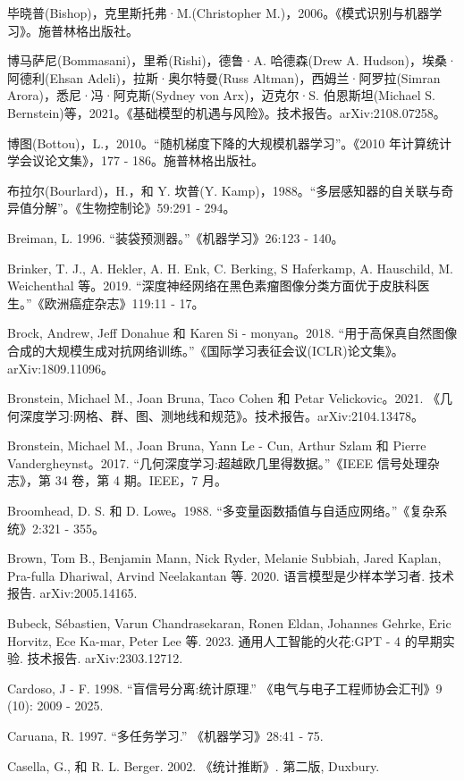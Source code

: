 \documentclass[10pt]{report}
\begin{document}
毕晓普(Bishop)，克里斯托弗·M.(Christopher M.)，2006。《模式识别与机器学习》。施普林格出版社。

博马萨尼(Bommasani)，里希(Rishi)，德鲁·A. 哈德森(Drew A. Hudson)，埃桑·阿德利(Ehsan Adeli)，拉斯·奥尔特曼(Russ Altman)，西姆兰·阿罗拉(Simran Arora)，悉尼·冯·阿克斯(Sydney von Arx)，迈克尔·S. 伯恩斯坦(Michael S. Bernstein)等，2021。《基础模型的机遇与风险》。技术报告。arXiv:2108.07258。

博图(Bottou)，L.，2010。“随机梯度下降的大规模机器学习”。《2010 年计算统计学会议论文集》，177 - 186。施普林格出版社。

布拉尔(Bourlard)，H.，和 Y. 坎普(Y. Kamp)，1988。“多层感知器的自关联与奇异值分解”。《生物控制论》59:291 - 294。

Breiman, L. 1996. “装袋预测器。”《机器学习》26:123 - 140。

Brinker, T. J., A. Hekler, A. H. Enk, C. Berking, S Haferkamp, A. Hauschild, M. Weichenthal 等。2019. “深度神经网络在黑色素瘤图像分类方面优于皮肤科医生。”《欧洲癌症杂志》119:11 - 17。

Brock, Andrew, Jeff Donahue 和 Karen Si - monyan。2018. “用于高保真自然图像合成的大规模生成对抗网络训练。”《国际学习表征会议(ICLR)论文集》。arXiv:1809.11096。

Bronstein, Michael M., Joan Bruna, Taco Cohen 和 Petar Velickovic。2021. 《几何深度学习:网格、群、图、测地线和规范》。技术报告。arXiv:2104.13478。

Bronstein, Michael M., Joan Bruna, Yann Le - Cun, Arthur Szlam 和 Pierre Vandergheynst。2017. “几何深度学习:超越欧几里得数据。”《IEEE 信号处理杂志》，第 34 卷，第 4 期。IEEE，7 月。

Broomhead, D. S. 和 D. Lowe。1988. “多变量函数插值与自适应网络。”《复杂系统》2:321 - 355。

Brown, Tom B., Benjamin Mann, Nick Ryder, Melanie Subbiah, Jared Kaplan, Pra-fulla Dhariwal, Arvind Neelakantan 等. 2020. 语言模型是少样本学习者. 技术报告. arXiv:2005.14165.

Bubeck, Sébastien, Varun Chandrasekaran, Ronen Eldan, Johannes Gehrke, Eric Horvitz, Ece Ka-mar, Peter Lee 等. 2023. 通用人工智能的火花:GPT - 4 的早期实验. 技术报告. arXiv:2303.12712.

Cardoso, J - F. 1998. “盲信号分离:统计原理.” 《电气与电子工程师协会汇刊》9 (10): 2009 - 2025.

Caruana, R. 1997. “多任务学习.” 《机器学习》28:41 - 75.

Casella, G., 和 R. L. Berger. 2002. 《统计推断》. 第二版, Duxbury.
\end{document}
